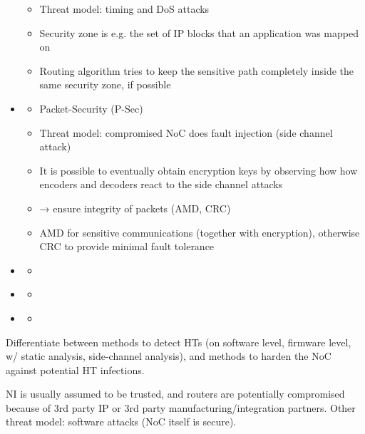 \documentclass[
	paper=a4,
	fontsize=11pt,
	parskip=full %
]{scrreprt}
\begin{document}
\begin{itemize}
\begin{itemize}
                \item Threat model: timing and DoS attacks
                \item Security zone is e.g. the set of IP blocks that an application was mapped on
                \item Routing algorithm tries to keep the sensitive path completely inside the same security zone, if possible
            \end{itemize}
        \item \textbf{}
            \begin{itemize}
                \item Packet-Security (P-Sec)
                \item Threat model: compromised NoC does fault injection (side channel attack)
                \item It is possible to eventually obtain encryption keys by observing how how encoders and decoders react to the side channel attacks
                \item → ensure integrity of packets (AMD, CRC)
                \item AMD for sensitive communications (together with encryption), otherwise CRC to provide minimal fault tolerance
            \end{itemize}
        \item \textbf{}
            \begin{itemize}
                \item
            \end{itemize}
        \item \textbf{}
            \begin{itemize}
                \item
            \end{itemize}
        \item \textbf{}
            \begin{itemize}
                \item
            \end{itemize}
    \end{itemize}

    Differentiate between methods to detect HTs (on software level, firmware level, w/ static analysis, side-channel analysis), and methods to harden
    the NoC against potential HT infections.

    NI is usually assumed to be trusted, and routers are potentially compromised because of 3rd party IP or 3rd party manufacturing/integration
    partners. Other threat model: software attacks (NoC itself is secure).
\end{document}
